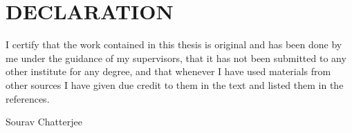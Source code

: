 \chapter*{DECLARATION}
I certify that the work contained in this thesis is original and has been done by me under the
guidance of my supervisors, that it has not been submitted to any other institute for any
degree, and that whenever I have used materials from other sources I have given due credit to
them in the text and listed them in the references.\par\vspace{1in}
\noindent Sourav Chatterjee
\clearpage
